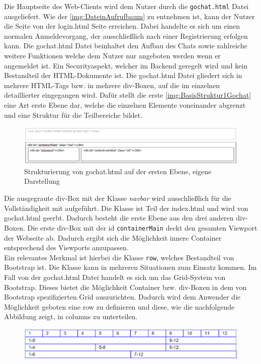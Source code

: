 \documentclass[a4paper,titlepage,halfparskip,12pt]{scrreprt}
\begin{document}
\begin{onehalfspacing}
Die Hauptseite des Web-Clients wird dem Nutzer durch die \texttt{gochat.html} Datei ausgeliefert. Wie der \autoref{img:DateinAufrufbaum} zu entnehmen ist, kann der Nutzer die Seite von der login.html Seite erreichen. Dabei handelte es sich um einen normalen Anmeldevorgang, der ausschließlich nach einer Registrierung erfolgen kann. Die gochat.html Datei beinhaltet den Aufbau des Chats sowie zahlreiche weitere Funktionen welche dem Nutzer nur angeboten werden wenn er angemeldet ist. Ein Securityaspekt, welcher im Backend geregelt wird und kein Bestandteil der HTML-Dokumente ist. Die gochat.html Datei gliedert sich in mehrere HTML-Tags bzw. in mehrere div-Boxen, auf die im einzelnen detaillierter eingegangen wird. Dafür stellt die erste \autoref{img:BasisStruktur1Gochat} eine Art erste Ebene dar, welche die einzelnen Elemente voneinander abgrenzt und eine Struktur für die Teilbereiche bildet.
\begin{figure}[h]
	\centering
	\includegraphics[width=\linewidth]{images/BasisStruktur1Gochat}
	\caption{Strukturierung von gochat.html auf der ersten Ebene, eigene Darstellung}
	\label{img:BasisStruktur1Gochat}
\end{figure}
Die ausgegraute div-Box mit der Klasse \textit{navbar} wird ausschließlich für die Vollständigkeit mit aufgeführt. Die Klasse ist Teil der index.html und wird von gochat.html geerbt. Dadurch besteht die erste Ebene aus den drei anderen div-Boxen. Die erste div-Box mit der id \texttt{containerMain} deckt den gesamten Viewport der Webseite ab. Dadurch ergibt sich die Möglichkeit innere Container entsprechend des Viewports anzupassen.\\
Ein relevantes Merkmal ist hierbei die Klasse \texttt{row}, welches Bestandteil von Bootstrap ist. Die Klasse kann in mehreren Situationen zum Einsatz kommen. Im Fall von der gochat.html Datei handelt es sich um das Grid-System von Bootstrap. Dieses bietet die Möglichkeit Container bzw. div-Boxen in dem von Bootstrap spezifizierten Grid auszurichten. Dadurch wird dem Anwender die Möglichkeit geboten eine row zu definieren und diese, wie die nachfolgende Abbildung zeigt, in columns zu unterteilen.
\begin{figure}[h]
	\centering
	\includegraphics[scale=0.9]{images/GridSystem}

\end{figure}
\end{onehalfspacing}
\end{document}
